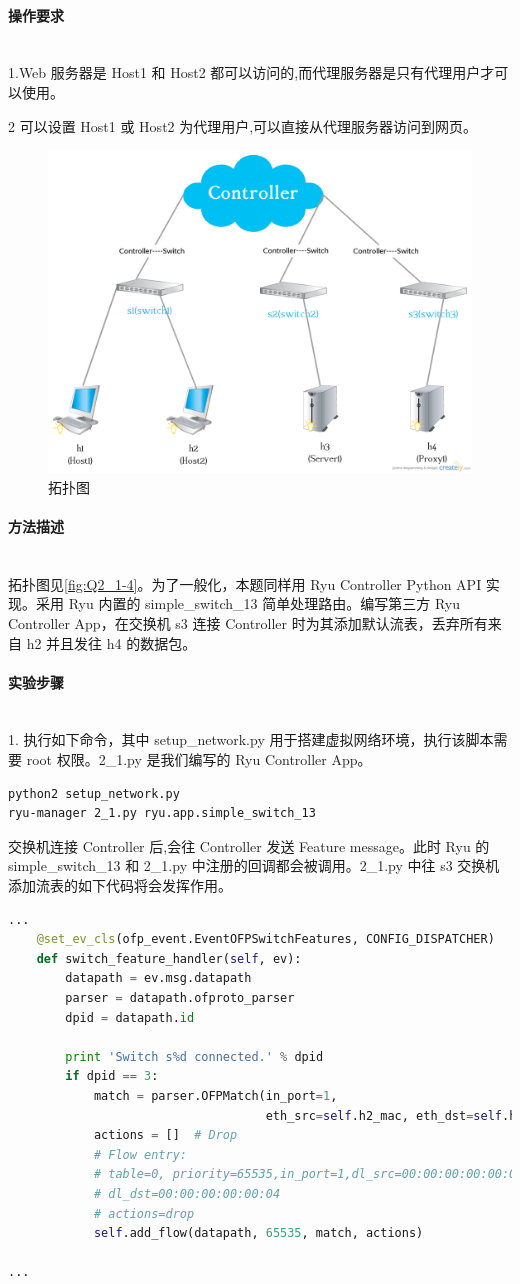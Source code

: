 \documentclass[format=draft,language=chinese,category=SDN]{hustreport}
\newcommand{\myparagraph}[1]{\paragraph{#1}\mbox{}\\}
\begin{document}
\myparagraph{操作要求}

1.Web 服务器是 Host1 和 Host2 都可以访问的,而代理服务器是只有代理用户才可以使用。

2 可以设置 Host1 或 Host2 为代理用户,可以直接从代理服务器访问到网页。

\begin{figure}[!h]
\centering
\includegraphics[width=.618\textwidth]{fig/2_1-4.png}
\caption{拓扑图}\label{fig:Q2_1-4}
\end{figure}

\myparagraph{方法描述}

拓扑图见\autoref{fig:Q2_1-4}。为了一般化，本题同样用 Ryu Controller Python API 实现。采用 Ryu 内置的 simple\_switch\_13 简单处理路由。编写第三方 Ryu Controller App，在交换机 s3 连接 Controller 时为其添加默认流表，丢弃所有来自 h2 并且发往 h4 的数据包。

\myparagraph{实验步骤}

1. 执行如下命令，其中 setup\_network.py 用于搭建虚拟网络环境，执行该脚本需要 root 权限。2\_1.py 是我们编写的 Ryu Controller App。

\begin{lstlisting}[language=bash]
python2 setup_network.py
ryu-manager 2_1.py ryu.app.simple_switch_13
\end{lstlisting}

交换机连接 Controller 后,会往 Controller 发送 Feature message。此时 Ryu 的 simple\_switch\_13 和 2\_1.py 中注册的回调都会被调用。2\_1.py 中往 s3 交换机添加流表的如下代码将会发挥作用。

\begin{lstlisting}[language=python]
...
    @set_ev_cls(ofp_event.EventOFPSwitchFeatures, CONFIG_DISPATCHER)
    def switch_feature_handler(self, ev):
        datapath = ev.msg.datapath
        parser = datapath.ofproto_parser
        dpid = datapath.id

        print 'Switch s%d connected.' % dpid
        if dpid == 3:
            match = parser.OFPMatch(in_port=1,
                                    eth_src=self.h2_mac, eth_dst=self.h4_mac)
            actions = []  # Drop
            # Flow entry:
            # table=0, priority=65535,in_port=1,dl_src=00:00:00:00:00:02,
            # dl_dst=00:00:00:00:00:04
            # actions=drop
            self.add_flow(datapath, 65535, match, actions)

...
\end{lstlisting}
\end{document}

